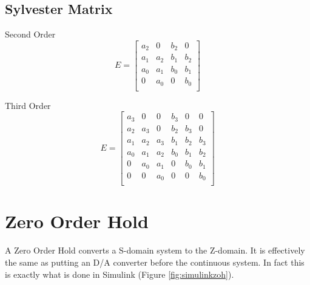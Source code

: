 \documentclass{article}
\begin{document}
\subsection{Sylvester Matrix}
\label{sec:sylvester}

Second Order
\[
E=
\begin{bmatrix}
	a_2 & 0 & b_2 & 0 \\
	a_1 & a_2 & b_1 & b_2 \\
	a_0 & a_1 & b_0 & b_1 \\
	0 & a_0 & 0 & b_0 \\
\end{bmatrix}
\]

Third Order
\[
E=
\begin{bmatrix}
	a_3 & 0 & 0 & b_3 & 0 & 0 \\
	a_2 & a_3 & 0 & b_2 & b_3 & 0 \\
	a_1 & a_2 & a_3 & b_1 & b_2 & b_3 \\
	a_0 & a_1 & a_2 & b_0 & b_1 & b_2 \\
	0 & a_0 & a_1 & 0 & b_0 & b_1 \\
	0 & 0 & a_0 & 0 & 0 & b_0 \\
\end{bmatrix}
\]


\clearpage
\section{Zero Order Hold}
\label{sec:zoh}

A Zero Order Hold converts a S-domain system to the Z-domain.
It is effectively the same as putting an D/A converter before
the continuous system.
In fact this is exactly what is done in Simulink (Figure \ref{fig:simulinkzoh}).
\end{document}
